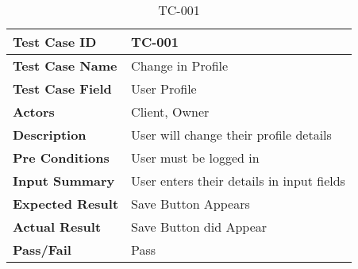 
\begin{table}[h]
    \centering
    \caption{TC-001}
    \begin{tabular}{ |p{3.8cm}|p{8cm}| }
        \hline
        \textbf{Test Case ID}    & TC-001                                    \\
        \hline
        \textbf{Test Case Name}  & Change in Profile                         \\
        \hline
        \textbf{Test Case Field} & User Profile                              \\
        \hline
        \textbf{Actors}          & Client, Owner                             \\
        \hline
        \textbf{Description}     & User will change their profile details    \\
        \hline
        \textbf{Pre Conditions}  & User must be logged in                    \\
        \hline
        \textbf{Input Summary}   & User enters their details in input fields \\
        \hline
        \textbf{Expected Result} & Save Button Appears                       \\
        \hline
        \textbf{Actual Result}   & Save Button did Appear                    \\
        \hline
        \textbf{Pass/Fail}       & Pass                                      \\
        \hline
    \end{tabular}
\end{table}